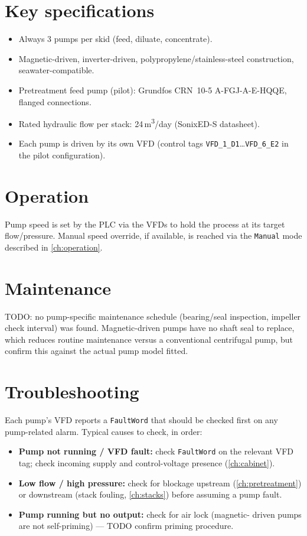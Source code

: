 \documentclass[a4paper,11pt,twoside,openright,numbers=noenddot]{scrreprt}
\newcommand{\plctag}[1]{\texttt{\small #1}}
\begin{document}
\section{Key specifications}
\begin{itemize}
\item Always 3 pumps per skid (feed, diluate, concentrate).
\item Magnetic-driven, inverter-driven, polypropylene/stainless-steel
  construction, seawater-compatible.
\item Pretreatment feed pump (pilot): Grundfos CRN~10-5 A-FGJ-A-E-HQQE,
  flanged connections.
\item Rated hydraulic flow per stack: 24\,m\textsuperscript{3}/day
  (SonixED-S datasheet).
\item Each pump is driven by its own VFD (control tags
  \plctag{VFD\_1\_D1}\dots\plctag{VFD\_6\_E2} in the pilot configuration).
\end{itemize}

\section{Operation}
Pump speed is set by the PLC via the VFDs to hold the process at its
target flow/pressure. Manual speed override, if available, is reached via
the \plctag{Manual} mode described in \cref{ch:operation}.

\section{Maintenance}
TODO: no pump-specific maintenance schedule (bearing/seal inspection,
impeller check interval) was found. Magnetic-driven pumps have no shaft
seal to replace, which reduces routine maintenance versus a conventional
centrifugal pump, but confirm this against the actual pump model fitted.

\section{Troubleshooting}
Each pump's VFD reports a \plctag{FaultWord} that should be checked first
on any pump-related alarm. Typical causes to check, in order:
\begin{itemize}
\item \textbf{Pump not running / VFD fault:} check \plctag{FaultWord} on
  the relevant VFD tag; check incoming supply and control-voltage presence
  (\cref{ch:cabinet}).
\item \textbf{Low flow / high pressure:} check for blockage upstream
  (\cref{ch:pretreatment}) or downstream (stack fouling,
  \cref{ch:stacks}) before assuming a pump fault.
\item \textbf{Pump running but no output:} check for air lock (magnetic-
  driven pumps are not self-priming) --- TODO confirm priming procedure.
\end{itemize}
\end{document}
